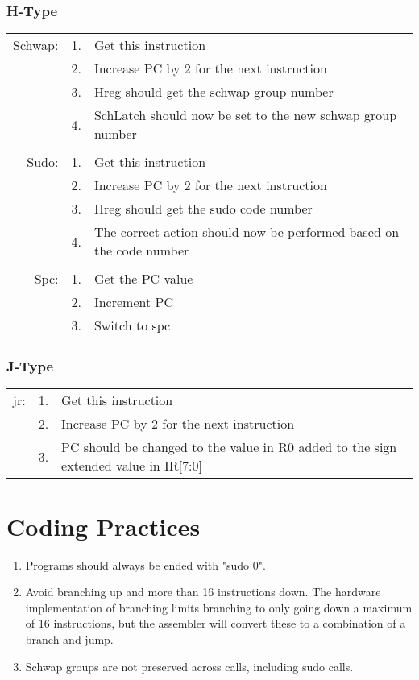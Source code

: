 		\subsubsection{H-Type}
			\begin{tabular}{ r  r  p{12cm} }
				Schwap: & 1. & Get this instruction\\
				        & 2. & Increase PC by 2 for the next instruction\\
				        & 3. & Hreg should get the schwap group number\\
				        & 4. & SchLatch should now be set to the new schwap group number\\
				        &    & \\
				Sudo:   & 1. & Get this instruction\\
				        & 2. & Increase PC by 2 for the next instruction\\
				        & 3. & Hreg should get the sudo code number\\
				        & 4. & The correct action should now be performed based on the code number\\
				        &    & \\
				Spc:    & 1. & Get the PC value\\
				        & 2. & Increment PC\\
				        & 3. & Switch to spc\\
			\end{tabular}
		\subsubsection{J-Type}
			\begin{tabular}{ r  r  p{12cm} }
				jr: & 1. & Get this instruction\\
				    & 2. & Increase PC by 2 for the next instruction\\
				    & 3. & PC should be changed to the value in R0 added to the sign extended value in IR[7:0]\\
			\end{tabular}
\section{Coding Practices}
	\begin{enumerate}
		\item Programs should always be ended with "sudo 0".
		\item Avoid branching up and more than 16 instructions down.  The hardware implementation of branching limits branching to only going down a maximum of 16 instructions, but the assembler will convert these to a combination of a branch and jump.
		\item Schwap groups are not preserved across calls, including sudo calls.
	\end{enumerate}
